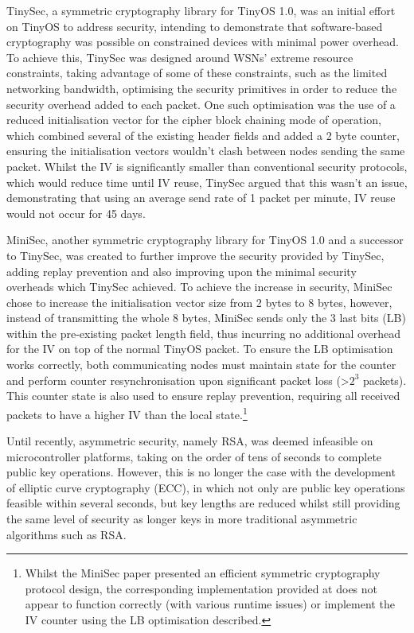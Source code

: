 \documentclass[conference]{./sty/IEEEtran}
\begin{document}
TinySec\cite{TinySec}, a symmetric cryptography library for TinyOS 1.0, was an initial effort on TinyOS to address security, intending to demonstrate that software-based cryptography was possible on constrained devices with minimal power overhead. To achieve this, TinySec was designed around WSNs' extreme resource constraints, taking advantage of some of these constraints, such as the limited networking bandwidth, optimising the security primitives in order to reduce the security overhead added to each packet. One such optimisation was the use of a reduced initialisation vector for the cipher block chaining mode of operation, which combined several of the existing header fields and added a 2 byte counter, ensuring the initialisation vectors wouldn't clash between nodes sending the same packet. Whilst the IV is significantly smaller than conventional security protocols, which would reduce time until IV reuse, TinySec argued that this wasn't an issue, demonstrating that using an average send rate of 1 packet per minute, IV reuse would not occur for 45 days.

MiniSec, another symmetric cryptography library for TinyOS 1.0 and a successor to TinySec, was created to further improve the security provided by TinySec, adding replay prevention and also improving upon the minimal security overheads which TinySec achieved. To achieve the increase in security, MiniSec chose to increase the initialisation vector size from 2 bytes to 8 bytes, however, instead of transmitting the whole 8 bytes, MiniSec sends only the 3 last bits (LB) within the pre-existing packet length field, thus incurring no additional overhead for the IV on top of the normal TinyOS packet. To ensure the LB optimisation works correctly, both communicating nodes must maintain state for the counter and perform counter resynchronisation upon significant packet loss (\textgreater$2^3$ packets). This counter state is also used to ensure replay prevention, requiring all received packets to have a higher IV than the local state.\footnote{Whilst the MiniSec paper presented an efficient symmetric cryptography protocol design, the corresponding implementation provided at \cite{MiniSecLink} does not appear to function correctly (with various runtime issues) or implement the IV counter using the LB optimisation described.}

Until recently, asymmetric security, namely RSA, was deemed infeasible on microcontroller platforms, taking on the order of tens of seconds to complete public key operations\cite{TinyECC}. However, this is no longer the case with the development of elliptic curve cryptography (ECC), in which not only are public key operations feasible within several seconds, but key lengths are reduced whilst still providing the same level of security as longer keys in more traditional asymmetric algorithms such as RSA. 
\end{document}
